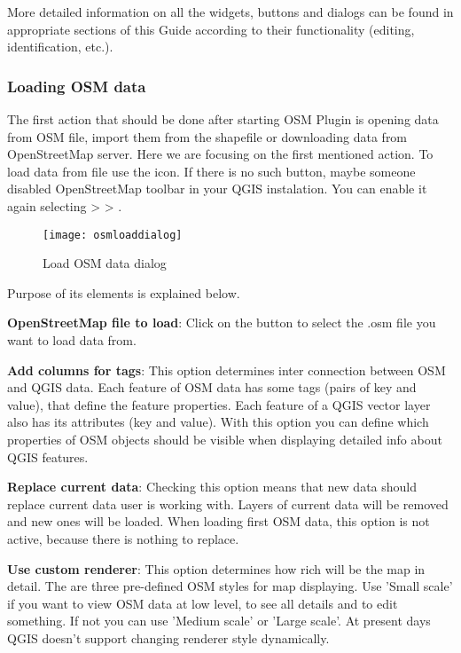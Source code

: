 More detailed information on all the widgets, buttons and dialogs can be
found in appropriate sections of this Guide according to their functionality
(editing, identification, etc.).

\subsubsection{Loading OSM data}

The first action that should be done after starting OSM Plugin is opening
data from OSM file, import them from the shapefile or downloading data from
OpenStreetMap server. Here we are focusing on the first mentioned action.
To load data from file use the  
icon. If there is no such button, maybe someone disabled OpenStreetMap 
toolbar in your QGIS instalation. You can enable it again selecting
 >  > .

\begin{figure}[ht]
   \begin{center}
   \caption{Load OSM data dialog \nixcaption}\label{fig:osmload}\smallskip
   \texttt{[image: osmloaddialog]}
\end{center}
\end{figure}

Purpose of its elements is explained below.

\begin{description}
\item \textbf{OpenStreetMap file to load}: Click on the button to select 
the .osm file you want to load data from.
\item \textbf{Add columns for tags}: This option determines 
inter connection between OSM and QGIS data. Each feature of OSM data has 
some tags (pairs of key and value), that define the feature properties. 
Each feature of a QGIS vector layer also has its attributes (key and value). 
With this option you can define which properties of OSM objects should 
be visible when displaying detailed info about QGIS features.
\item \textbf{Replace current data}: Checking this option means that 
new data should replace current data user is working with. Layers of 
current data will be removed and new ones will be loaded. When loading 
first OSM data, this option is not active, because there is nothing 
to replace.
\item \textbf{Use custom renderer}: This option determines how rich will 
be the map in detail. The are three pre-defined OSM styles for map 
displaying. Use 'Small scale' if you want to view OSM data at low level, 
to see all details and to edit something. If not you can use 
'Medium scale' or 'Large scale'. At present days QGIS doesn't support 
changing renderer style dynamically.
\end{description}

